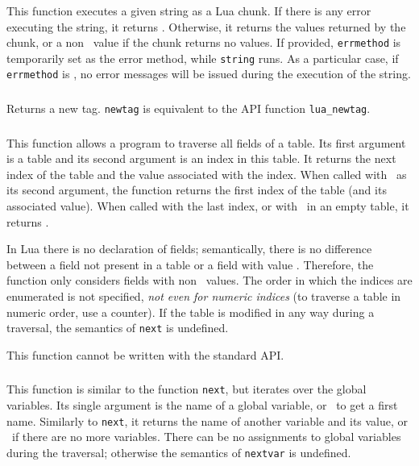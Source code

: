 \subsubsection*{\ff {}}
This function executes a given string as a Lua chunk.
If there is any error executing the string, it returns \nil.
Otherwise, it returns the values returned by the chunk,
or a non \nil\ value if the chunk returns no values.
If provided, \verb|errmethod| is temporarily set as the error method,
while \verb|string| runs.
As a particular case, if \verb|errmethod| is \nil,
no error messages will be issued during the execution of the string.

\subsubsection*{\ff {}}\label{pdf-newtag}
Returns a new tag.
\verb|newtag| is equivalent to the API function \verb|lua_newtag|.

\subsubsection*{\ff {}}
This function allows a program to traverse all fields of a table.
Its first argument is a table and its second argument
is an index in this table.
It returns the next index of the table and the
value associated with the index.
When called with \nil\ as its second argument,
the function returns the first index
of the table (and its associated value).
When called with the last index, or with \nil\ in an empty table,
it returns \nil.

In Lua there is no declaration of fields;
semantically, there is no difference between a
field not present in a table or a field with value \nil.
Therefore, the function only considers fields with non \nil\ values.
The order in which the indices are enumerated is not specified,
\emph{not even for numeric indices}
(to traverse a table in numeric order,
use a counter).
If the table is modified in any way during a traversal,
the semantics of \verb|next| is undefined.

This function cannot be written with the standard API.

\subsubsection*{\ff {}}
This function is similar to the function \verb|next|,
but iterates over the global variables.
Its single argument is the name of a global variable,
or \nil\ to get a first name.
Similarly to \verb|next|, it returns the name of another variable
and its value,
or \nil\ if there are no more variables.
There can be no assignments to global variables during the traversal;
otherwise the semantics of \verb|nextvar| is undefined.


